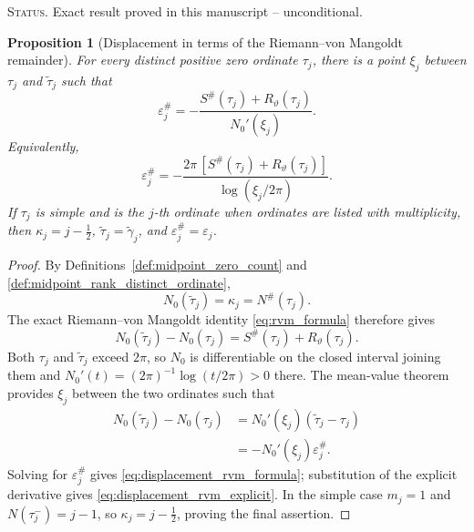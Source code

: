 \documentclass[11pt]{amsart}
\numberwithin{equation}{section}
\theoremstyle{plain}
\newtheorem{proposition}[theorem]{Proposition}
\theoremstyle{definition}
\theoremstyle{remark}
\newcommand{\1}{\mathbf{1}}
\newcommand{\statusnote}[1]{%
  \par\smallskip\noindent
  \begingroup\footnotesize\textsc{Status.} #1\endgroup
  \par\smallskip}
\begin{document}
\statusnote{Exact result proved in this manuscript -- unconditional.}
\begin{proposition}[Displacement in terms of the Riemann--von Mangoldt remainder]
\label{prop:displacement_rvm_remainder}
For every distinct positive zero ordinate \(\tau_j\), there is a point
\(\xi_j\) between \(\tau_j\) and \(\widetilde\tau_j\) such that
\begin{equation}
\boxed{
\varepsilon_j^{\#}
=
-
\frac{S^{\#}(\tau_j)+R_\vartheta(\tau_j)}
{N_0'(\xi_j)}.
}
\label{eq:displacement_rvm_formula}
\end{equation}
Equivalently,
\begin{equation}
\varepsilon_j^{\#}
=
-
\frac{2\pi\,[S^{\#}(\tau_j)+R_\vartheta(\tau_j)]}
{\log(\xi_j/2\pi)}.
\label{eq:displacement_rvm_explicit}
\end{equation}
If \(\tau_j\) is simple and is the \(j\)-th ordinate when ordinates are
listed with multiplicity, then
\(\kappa_j=j-\tfrac12\),
\(\widetilde\tau_j=\widetilde\gamma_j\), and
\(\varepsilon_j^{\#}=\varepsilon_j\).
\end{proposition}

\begin{proof}
By Definitions~\ref{def:midpoint_zero_count} and
\ref{def:midpoint_rank_distinct_ordinate},
\begin{equation}
N_0(\widetilde\tau_j)
=
\kappa_j
=
N^{\#}(\tau_j).
\label{eq:displacement_count_equalities}
\end{equation}
The exact Riemann--von Mangoldt identity
\eqref{eq:rvm_formula} therefore gives
\begin{equation}
N_0(\widetilde\tau_j)-N_0(\tau_j)
=
S^{\#}(\tau_j)+R_\vartheta(\tau_j).
\label{eq:displacement_count_difference}
\end{equation}
Both \(\tau_j\) and \(\widetilde\tau_j\) exceed \(2\pi\), so \(N_0\) is
differentiable on the closed interval joining them and
\(N_0'(t)=(2\pi)^{-1}\log(t/2\pi)>0\) there.  The mean-value theorem
provides \(\xi_j\) between the two ordinates such that
\begin{align}
N_0(\widetilde\tau_j)-N_0(\tau_j)
&=
N_0'(\xi_j)(\widetilde\tau_j-\tau_j)
\label{eq:displacement_mvt_first}
\\
&=
-N_0'(\xi_j)\varepsilon_j^{\#}.
\label{eq:displacement_mvt}
\end{align}
Solving for \(\varepsilon_j^{\#}\) gives
\eqref{eq:displacement_rvm_formula}; substitution of the explicit
derivative gives \eqref{eq:displacement_rvm_explicit}.  In the simple
case \(m_j=1\) and \(N(\tau_j^-)=j-1\), so
\(\kappa_j=j-\tfrac12\), proving the final assertion.
\end{proof}
\end{document}
